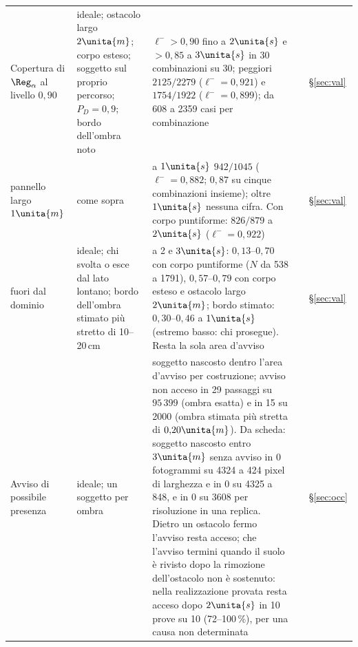 \begin{table}[p]
\begin{tabularx}{\textwidth}{@{}>{\RaggedRight\arraybackslash}p{2.8cm}>{\RaggedRight\arraybackslash}p{4.1cm}L>{\RaggedRight\arraybackslash}p{1.2cm}>{\RaggedRight\arraybackslash}p{1.05cm}@{}}
Copertura di $\Reg_\alpha$ al livello $0{,}90$ & ideale; ostacolo largo $2\unita{m}$; corpo esteso; soggetto sul proprio percorso; $P_D=0{,}9$; bordo dell'ombra noto & $\ell^->0{,}90$ fino a $2\unita{s}$ e $>0{,}85$ a $3\unita{s}$ in 30 combinazioni su 30; peggiori $2125/2279$ ($\ell^-=0{,}921$) e $1754/1922$ ($\ell^-=0{,}899$); da 608 a 2359 casi per combinazione &  & \S\ref{sec:val}\\
\quad pannello largo $1\unita{m}$ & come sopra & a $1\unita{s}$ $942/1045$ ($\ell^-=0{,}882$; $0{,}87$ su cinque combinazioni insieme); oltre $1\unita{s}$ nessuna cifra. Con corpo puntiforme: $826/879$ a $2\unita{s}$ ($\ell^-=0{,}922$) &  & \S\ref{sec:val}\\
\quad fuori dal dominio & ideale; chi svolta o esce dal lato lontano; bordo dell'ombra stimato più stretto di 10--20\,cm & a 2 e $3\unita{s}$: $0{,}13$--$0{,}70$ con corpo puntiforme ($N$ da 538 a 1791), $0{,}57$--$0{,}79$ con corpo esteso e ostacolo largo $2\unita{m}$; bordo stimato: $0{,}30$--$0{,}46$ a $1\unita{s}$ (estremo basso: chi prosegue). Resta la sola area d'avviso &  & \S\ref{sec:val}\\
Avviso di possibile presenza & ideale; un soggetto per ombra & soggetto nascosto dentro l'area d'avviso per costruzione; avviso non acceso in 29 passaggi su $95\,399$ (ombra esatta) e in 15 su 2000 (ombra stimata più stretta di $0{,}20\unita{m}$). Da scheda: soggetto nascosto entro $3\unita{m}$ senza avviso in 0 fotogrammi su 4324 a 424 pixel di larghezza e in 0 su 4325 a 848, e in 0 su 3608 per risoluzione in una replica. Dietro un ostacolo fermo l'avviso resta acceso; che l'avviso termini quando il suolo è rivisto dopo la rimozione dell'ostacolo non è sostenuto: nella realizzazione provata resta acceso dopo $2\unita{s}$ in 10 prove su 10 (72--100\,\%), per una causa non determinata &  & \S\ref{sec:occ}\\
\bottomrule
\end{tabularx}
\end{table}

